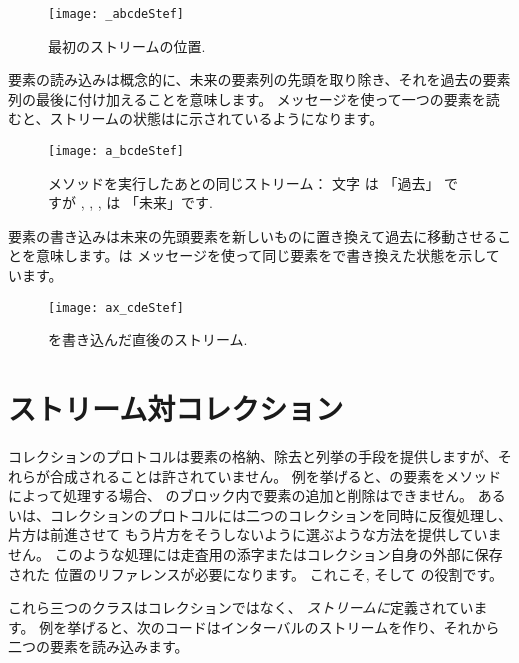 \documentclass[a4paper,10pt,twoside]{book}
\begin{document}
\begin{figure}[ht]
\centerline{\texttt{[image: \_abcdeStef]}}
\caption{最初のストリームの位置.}
\vspace{.2in}
\end{figure}

要素の読み込みは概念的に、未来の要素列の先頭を取り除き、それを過去の要素列の最後に付け加えることを意味します。
メッセージを使って一つの要素を読むと、ストリームの状態はに示されているようになります。

\begin{figure}[ht]
\centerline{\texttt{[image: a\_bcdeStef]}}
\caption{メソッドを実行したあとの同じストリーム： 文字  は 「過去」 ですが , , ,  は 「未来」です.}
\vspace{.2in}
\end{figure}

要素の書き込みは未来の先頭要素を新しいものに置き換えて過去に移動させることを意味します。は メッセージを使って同じ要素をで書き換えた状態を示しています。


\begin{figure}[ht]
\centerline{\texttt{[image: ax\_cdeStef]}}
\caption{を書き込んだ直後のストリーム.}
\vspace{.2in}
\end{figure}

\section{ストリーム対コレクション}

コレクションのプロトコルは要素の格納、除去と列挙の手段を提供しますが、それらが合成されることは許されていません。
例を挙げると、の要素をメソッドによって処理する場合、
のブロック内で要素の追加と削除はできません。
あるいは、コレクションのプロトコルには二つのコレクションを同時に反復処理し、片方は前進させて
もう片方をそうしないように選ぶような方法を提供していません。
このような処理には走査用の添字またはコレクション自身の外部に保存された
位置のリファレンスが必要になります。
これこそ,   そして の役割です。



これら三つのクラスはコレクションではなく、 \emph{ストリームに}定義されています。
例を挙げると、次のコードはインターバルのストリームを作り、それから二つの要素を読み込みます。
\end{document}
